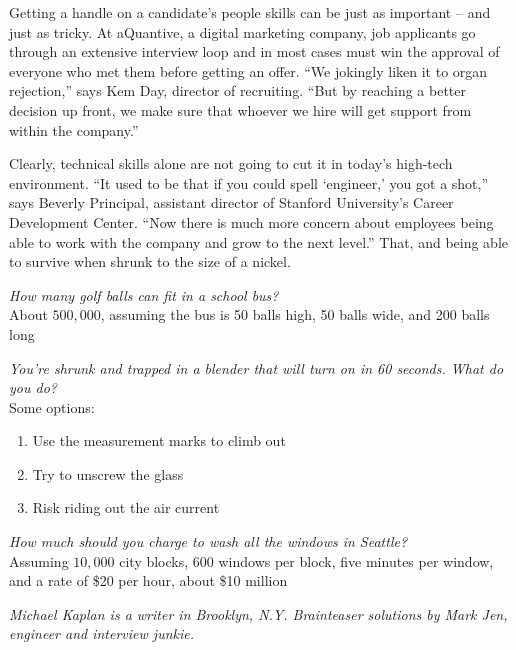 \documentclass[10pt]{article}
\begin{document}
Getting a handle on a candidate's people skills can be just as important -- and just as tricky. At aQuantive, a digital marketing company, job applicants go through an extensive interview loop and in most cases must win the approval of everyone who met them before getting an offer.  ``We jokingly liken it to organ rejection,'' says Kem Day, director of recruiting.  ``But by reaching a better decision up front, we make sure that whoever we hire will get support from within the company.''

Clearly, technical skills alone are not going to cut it in today's high-tech environment.  ``It used to be that if you could spell `engineer,' you got a shot,'' says Beverly Principal, assistant director of Stanford University's Career Development Center.  ``Now there is much more concern about employees being able to work with the company and grow to the next level.''  That, and being able to survive when shrunk to the size of a nickel.

\emph{How many golf balls can fit in a school bus?}\\
About $500,000$, assuming the bus is 50 balls high, 50 balls wide, and 200 balls long

\emph{You're shrunk and trapped in a blender that will turn on in 60 seconds. What do you do?}\\
Some options:
\begin{enumerate}
\item Use the measurement marks to climb out

\item Try to unscrew the glass

\item Risk riding out the air current
\end{enumerate}

\emph{How much should you charge to wash all the windows in Seattle?}\\
Assuming $10,000$ city blocks, 600 windows per block, five minutes per window, and a rate of \$20 per hour, about \$10 million

\emph{Michael Kaplan is a writer in Brooklyn, N.Y.  Brainteaser solutions by Mark Jen, engineer and interview junkie.}
\end{document}
